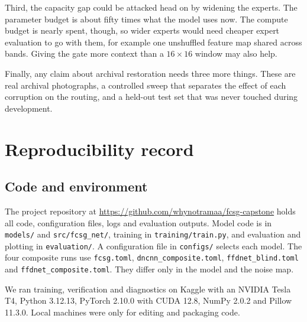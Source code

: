\documentclass[12pt,a4paper,oneside]{NITR}
\begin{document}
Third, the capacity gap could be attacked head on by widening the experts.
The parameter budget is about fifty times what the model uses now. The
compute budget is nearly spent, though, so wider experts would need cheaper
expert evaluation to go with them, for example one unshuffled feature map
shared across bands. Giving the gate more context than a $16\times16$ window
may also help.

Finally, any claim about archival restoration needs three more things. These
are real archival photographs, a controlled sweep that separates the effect
of each corruption on the routing, and a held-out test set that was never
touched during development.

\thispagestyle{empty}\cleardoublepage

\lhead{}
\renewcommand\bibname{References}
{
	\fontsize{10}{12}
	\selectfont
	
}
\cleardoublepage

\appendix
\chapter{Reproducibility record}\label{app:repro}

\section{Code and environment}

The project repository at \url{https://github.com/whynotramaa/fcsg-capstone}
holds all code, configuration files, logs and evaluation outputs. Model code
is in \texttt{models/} and \texttt{src/fcsg\_net/}, training in
\texttt{training/train.py}, and evaluation and plotting in
\texttt{evaluation/}. A configuration file in \texttt{configs/} selects each
model. The four composite runs use \texttt{fcsg.toml},
\texttt{dncnn\_composite.toml}, \texttt{ffdnet\_blind.toml} and
\texttt{ffdnet\_composite.toml}. They differ only in the model and the noise
map.

We ran training, verification and diagnostics on Kaggle with an NVIDIA Tesla
T4, Python 3.12.13, PyTorch 2.10.0 with CUDA 12.8, NumPy 2.0.2 and Pillow
11.3.0. Local machines were only for editing and packaging code.
\end{document}
